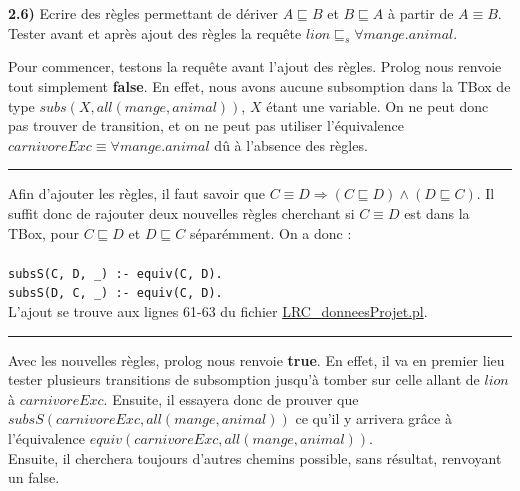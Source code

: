 \documentclass[a4paper,12pt]{report}
\begin{document}

\newpage

{}

\textbf{2.6)} Ecrire des règles permettant de dériver \(A \sqsubseteq B\) et \(B \sqsubseteq A\) à partir de \(A \equiv B\). Tester avant et 
    après ajout des règles la requête \(lion \sqsubseteq_s \forall mange.animal\).



\begin{tcolorbox}[colback=gray!10, colframe=blue!30, coltitle=black, title=Réponse à la question 2.6 - 1/1]

    Pour commencer, testons la requête avant l'ajout des règles. Prolog nous renvoie tout simplement \textbf{false}. En effet, nous avons aucune
        subsomption dans la TBox de type \(subs(X, all(mange, animal))\), \(X\) étant une variable. On ne peut donc pas trouver de transition, et 
        on ne peut pas utiliser l'équivalence \(carnivoreExc \equiv \forall mange.animal\) dû à l'absence des règles.

    \vspace{0.5cm}
    \hrule
    \vspace{0.5cm}

    Afin d'ajouter les règles, il faut savoir que \(C \equiv D \Rightarrow (C \sqsubseteq D) \land (D \sqsubseteq C)\). Il suffit donc de rajouter
        deux nouvelles règles cherchant si \(C \equiv D\) est dans la TBox, pour \(C \sqsubseteq D\) et \(D \sqsubseteq C\) séparémment. On a donc :\\\\
    \texttt{subsS(C, D, \_) :- equiv(C, D).}\\
    \texttt{subsS(D, C, \_) :- equiv(C, D).}\\

    L'ajout se trouve aux lignes 61-63 du fichier \href{./src/LRC\_donneesProjet.pl}{LRC\_donneesProjet.pl}.

    \vspace{0.5cm}
    \hrule
    \vspace{0.5cm}

    Avec les nouvelles règles, prolog nous renvoie \textbf{true}. En effet, il va en premier lieu tester plusieurs transitions de subsomption jusqu'à tomber
        sur celle allant de \(lion\) à \(carnivoreExc\). Ensuite, il essayera donc de prouver que \(subsS(carnivoreExc, all(mange, animal))\) ce qu'il y arrivera
        grâce à l'équivalence \(equiv(carnivoreExc, all(mange, animal))\).\\

    Ensuite, il cherchera toujours d'autres chemins possible, sans résultat, renvoyant un false.

\end{tcolorbox}
\end{document}

